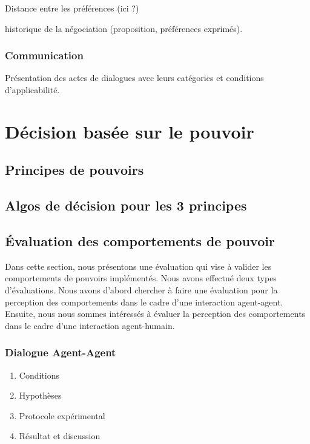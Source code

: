 \documentclass [french]{article}
\begin{document}
				Distance entre les préférences (ici ?)
				
				historique de la négociation (proposition, préférences exprimés).
				
			
		
			\subsubsection{Communication}
			 Présentation des actes de dialogues avec leurs catégories et conditions d'applicabilité. 
			
			 
			 


		\section{Décision basée sur le pouvoir}
			
			\subsection{Principes de pouvoirs }
			
			\subsection{Algos de décision pour les 3 principes}
			
			\subsection{Évaluation des comportements de pouvoir}
			Dans cette section, nous présentons une évaluation qui vise à valider les comportements de pouvoirs implémentés. Nous avons effectué deux types d'évaluations. Nous avons d'abord chercher à faire une évaluation pour la perception des comportements dans le cadre d'une interaction agent-agent.  Ensuite, nous nous sommes intéressés à évaluer la perception des comportements dans le cadre d'une interaction agent-humain. 
			
			\subsubsection{Dialogue Agent-Agent}
				\begin{enumerate}
					\item Conditions
					\item Hypothèses
					\item Protocole expérimental
					\item Résultat et discussion 
				\end{enumerate}
\end{document}
